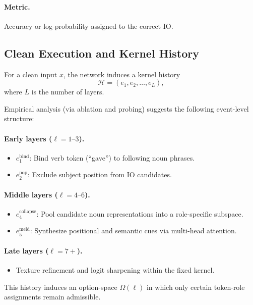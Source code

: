 \documentclass[11pt]{article}
\theoremstyle{remark}
\newcommand{\Hist}{\mathcal{H}}
\begin{document}
\paragraph{Metric.}
Accuracy or log-probability assigned to the correct IO.

\subsection{Clean Execution and Kernel History}

For a clean input $x$, the network induces a kernel history
\[
\Hist = (e_1, e_2, \ldots, e_L),
\]
where $L$ is the number of layers.

Empirical analysis (via ablation and probing) suggests the following
event-level structure:

\paragraph{Early layers ($\ell = 1\text{--}3$).}
\begin{itemize}
\item $e^{\mathrm{bind}}_1$: Bind verb token (``gave'') to following noun
phrases.
\item $e^{\mathrm{pop}}_2$: Exclude subject position from IO candidates.
\end{itemize}

\paragraph{Middle layers ($\ell = 4\text{--}6$).}
\begin{itemize}
\item $e^{\mathrm{collapse}}_4$: Pool candidate noun representations into
a role-specific subspace.
\item $e^{\mathrm{meld}}_5$: Synthesize positional and semantic cues via
multi-head attention.
\end{itemize}

\paragraph{Late layers ($\ell = 7+$).}
\begin{itemize}
\item Texture refinement and logit sharpening within the fixed kernel.
\end{itemize}

This history induces an option-space $\Omega(\ell)$ in which only
certain token-role assignments remain admissible.
\end{document}
